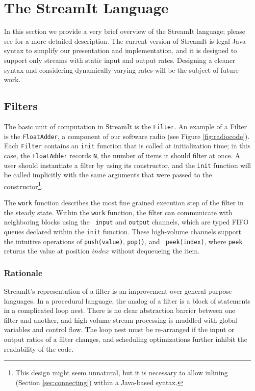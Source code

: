 \section{The StreamIt Language}
\label{sec:language}

In this section we provide a very brief overview of the StreamIt
language; please see \cite{streamittech} for a more detailed
description.  The current version of StreamIt is legal Java syntax to
simplify our presentation and implementation, and it is designed to
support only streams with static input and output rates.  Designing a
cleaner syntax and considering dynamically varying rates will be the
subject of future work.

\subsection{Filters}

The basic unit of computation in StreamIt is the {\tt Filter}.  An
example of a Filter is the {\tt FloatAdder}, a component of our
software radio (see Figure \ref{fig:radiocode}).  Each {\tt Filter}
contains an {\tt init} function that is called at initialization time;
in this case, the {\tt FloatAdder} records {\tt N}, the number of
items it should filter at once.  A user should instantiate a filter by
using its constructor, and the {\tt init} function will be called
implicitly with the same arguments that were passed to the
constructor{\footnote{This design might seem unnatural, but it is
necessary to allow inlining (Section \ref{sec:connecting}) within a
Java-based syntax.}}.

The {\tt work} function describes the most fine grained execution step
of the filter in the steady state.  Within the {\tt work} function,
the filter can communicate with neighboring blocks using the {\tt
input} and {\tt output} channels, which are typed FIFO queues declared
within the {\tt init} function.  These high-volume channels support
the intuitive operations of {\tt push(value)}, {\tt pop()}, and {\tt
peek(index)}, where {\tt peek} returns the value at position $index$
without dequeueing the item.

\subsubsection{Rationale}

StreamIt's representation of a filter is an improvement over
general-purpose languages.  In a procedural language, the analog of a
filter is a block of statements in a complicated loop nest.  There is
no clear abstraction barrier between one filter and another, and
high-volume stream processing is muddled with global variables and
control flow. The loop nest must be re-arranged if the input or output
ratios of a filter changes, and scheduling optimizations further
inhibit the readability of the code.

